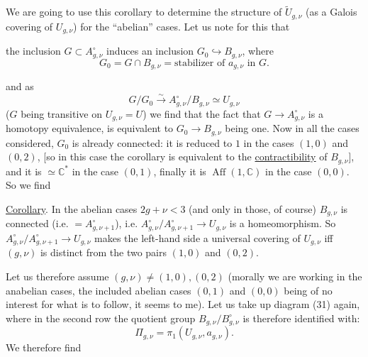 We are going to use this corollary to determine the structure of $\widetilde U_{g,\nu}$ (as a Galois covering of $U_{g,\nu}$) for the ``abelian'' cases. Let us note for this that


the inclusion $G\subset A_{g,\nu}^{\circ}$ induces an inclusion $G_0\hookrightarrow B_{g,\nu}$, where 
\[
\tag{40}
G_0=G\cap B_{g,\nu}=\text{stabilizer of }a_{g,\nu}\text{ in }G.
\]

and as
\[
G/G_0\xrightarrow{\sim}A_{g,\nu}^{\circ}/B_{g,\nu}\simeq U_{g,\nu}
\]
($G$ being transitive on $U_{g,\nu}=U$) we find that the fact that $G\longrightarrow A_{g,\nu}^{\circ}$ is a homotopy equivalence, is equivalent to $G_0\longrightarrow B_{g,\nu}$ being one. Now in all the cases considered, $G_0$ is already connected: it is reduced to $1$ in the cases $(1,0)$ and $(0,2)$, [so in this case the corollary is equivalent to the \uline{contractibility} of $B_{g,\nu}$], and it is $\simeq\mathbb C^*$ in the case $(0,1)$, finally it is $\operatorname{Aff}(1,\mathbb C)$ in the case $(0,0)$. So we find

\uline{Corollary}. In the abelian cases $2g+\nu<3$ (and only in those, of course) $B_{g,\nu}$ is connected (i.e. $=A_{g,\nu+1}^{\circ}$), i.e. $A_{g,\nu}^{\circ}/A_{g,\nu+1}^{\circ}\longrightarrow U_{g,\nu}$ is a homeomorphism. So $A_{g,\nu}^{\circ}/A_{g,\nu+1}^{\circ}\longrightarrow U_{g,\nu}$ makes the left-hand side a universal covering of $U_{g,\nu}$ iff $(g,\nu)$ is distinct from the two pairs $(1,0)$ and $(0,2)$.

Let us therefore assume $(g,\nu)\ne(1,0),(0,2)$ (morally we are working in the anabelian cases, the  included abelian cases $(0,1)$ and $(0,0)$ being  of no interest for what is to follow, it seems to me). Let us take up diagram (31) again, where in the second row the quotient group $B_{g,\nu}/B_{g,\nu}^{\circ}$ is therefore identified with:
\[
\Pi_{g,\nu}=\pi_1(U_{g,\nu},a_{g,\nu}).
\]
We therefore find

